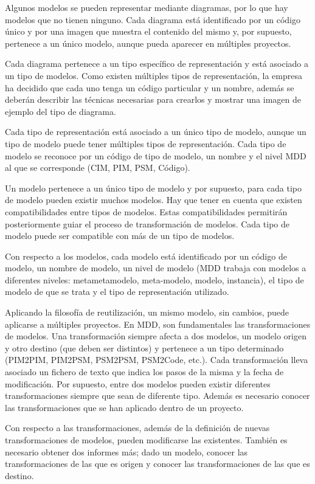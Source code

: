 \documentclass[a4paper]{article}
\begin{document}
Algunos modelos se pueden representar mediante diagramas, por lo que hay modelos que no
tienen ninguno. Cada diagrama está identificado por un código único y por una imagen que muestra el contenido del mismo y, por supuesto, pertenece a un único modelo, aunque pueda aparecer en múltiples proyectos.

Cada diagrama pertenece a un tipo específico de representación y está asociado a un tipo de modelos. Como existen múltiples tipos de representación, la empresa ha decidido que cada uno tenga un código particular y un nombre, además se deberán describir las técnicas necesarias para crearlos y mostrar una imagen de ejemplo del tipo de diagrama.

Cada tipo de representación está asociado a un único tipo de modelo, aunque un tipo de
modelo puede tener múltiples tipos de representación. Cada tipo de modelo se reconoce por un código de tipo de modelo, un nombre y el nivel MDD al que se corresponde (CIM, PIM, PSM, Código).

Un modelo pertenece a un único tipo de modelo y por supuesto, para cada tipo de modelo pueden existir muchos modelos. Hay que tener en cuenta que existen compatibilidades entre tipos de modelos. Estas compatibilidades permitirán posteriormente guiar el proceso de transformación de modelos. Cada tipo de modelo puede ser compatible con más de un tipo de modelos.

Con respecto a los modelos, cada modelo está identificado por un código de modelo, un nombre de modelo, un nivel de modelo (MDD trabaja con modelos a diferentes niveles: metametamodelo, meta-modelo, modelo, instancia), el tipo de modelo de que se trata y el tipo de representación utilizado.

Aplicando la filosofía de reutilización, un mismo modelo, sin cambios, puede aplicarse a múltiples proyectos. En MDD, son fundamentales las transformaciones de modelos. Una transformación siempre afecta a dos modelos, un modelo origen y otro destino (que deben ser distintos) y pertenece a un tipo determinado (PIM2PIM, PIM2PSM, PSM2PSM, PSM2Code, etc.). Cada transformación lleva asociado un fichero de texto que indica los pasos de la misma y la fecha de modificación. Por supuesto, entre dos modelos pueden existir diferentes transformaciones siempre que sean de diferente tipo. Además es necesario conocer las transformaciones que se han aplicado dentro de un proyecto.

Con respecto a las transformaciones, además de la definición de nuevas transformaciones de modelos, pueden modificarse las existentes. También es necesario obtener dos informes más; dado un modelo, conocer las transformaciones de las que es origen y conocer las transformaciones de las que es destino.
\end{document}
